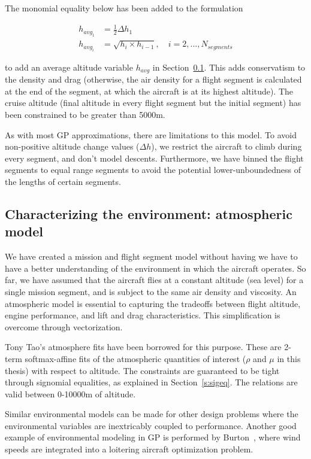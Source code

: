 The monomial equality below has been added to the formulation

\begin{align}
    h_{{avg}_1} &= \frac{1}{2}\Delta h_1 \\
    h_{{avg}_i} &= \sqrt{h_{i} \times h_{i-1}}, \quad i = 2,...,N_{segments}
\end{align}

to add an average altitude variable $h_{avg}$ in Section~\ref{s:atmos}. This adds
conservatism to the density and drag (otherwise, the air density for a flight segment is calculated
at the end of the segment, at which the aircraft is at its highest altitude).
The cruise altitude (final altitude in every flight segment but the initial segment) has been constrained
to be greater than 5000m.

As with most \gls{GP} approximations, there are limitations to this model. To avoid non-positive
altitude change values ($\Delta h$), we restrict the aircraft to climb during every segment, and
don't model descents. Furthermore, we have binned the flight segments to equal range segments to
avoid the potential lower-unboundedness of the lengths of certain segments.

\subsection{Characterizing the environment: atmospheric model}
\label{s:atmos}

We have created a mission and flight segment model without having we have to have a better understanding
of the environment in which the aircraft operates. So far, we have assumed that
the aircraft flies at a constant altitude (sea level) for a single mission segment,
and is subject to the same air density and viscosity.
An atmospheric model is essential to capturing the tradeoffs between flight altitude, engine performance,
and lift and drag characteristics.
This simplification is overcome through vectorization.

Tony Tao's atmosphere fits have been borrowed for this purpose. These are
2-term softmax-affine fits of the atmospheric
quantities of interest ($\rho$ and $\mu$ in this thesis) with respect to altitude. The constraints
are guaranteed to be tight through signomial equalities, as explained in Section~\ref{s:sigeq}.
The relations are valid between 0-10000m of altitude.

Similar environmental models can be made for other design problems where the environmental
variables are inextricably coupled to performance. Another good example of environmental modeling
in \gls{GP} is performed by Burton~\cite{gassolar}, where wind speeds are integrated into
a loitering aircraft optimization problem.

